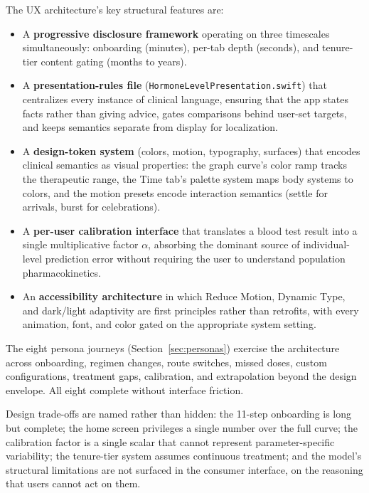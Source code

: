 \documentclass[11pt,a4paper]{article}
\newcommand{\code}[1]{\texttt{\small #1}}
\begin{document}
The UX architecture's key structural features are:

\begin{itemize}[nosep,leftmargin=1.4em]
\item A \textbf{progressive disclosure framework} operating on three
  timescales simultaneously: onboarding (minutes), per-tab depth
  (seconds), and tenure-tier content gating (months to years).
\item A \textbf{presentation-rules file}
  (\code{HormoneLevelPresentation.swift}) that centralizes every
  instance of clinical language, ensuring that the app states facts
  rather than giving advice, gates comparisons behind user-set targets,
  and keeps semantics separate from display for localization.
\item A \textbf{design-token system} (colors, motion, typography,
  surfaces) that encodes clinical semantics as visual properties: the
  graph curve's color ramp tracks the therapeutic range, the Time tab's
  palette system maps body systems to colors, and the motion presets
  encode interaction semantics (settle for arrivals, burst for
  celebrations).
\item A \textbf{per-user calibration interface} that translates a blood
  test result into a single multiplicative factor $\alpha$, absorbing
  the dominant source of individual-level prediction error without
  requiring the user to understand population pharmacokinetics.
\item An \textbf{accessibility architecture} in which Reduce Motion,
  Dynamic Type, and dark/light adaptivity are first principles rather
  than retrofits, with every animation, font, and color gated on the
  appropriate system setting.
\end{itemize}

The eight persona journeys (Section~\ref{sec:personas}) exercise the
architecture across onboarding, regimen changes, route switches, missed
doses, custom configurations, treatment gaps, calibration, and
extrapolation beyond the design envelope. All eight complete without
interface friction.

Design trade-offs are named rather than hidden: the 11-step onboarding is
long but complete; the home screen privileges a single number over the
full curve; the calibration factor is a single scalar that cannot
represent parameter-specific variability; the tenure-tier system assumes
continuous treatment; and the model's structural limitations are not
surfaced in the consumer interface, on the reasoning that users cannot
act on them.
\end{document}
